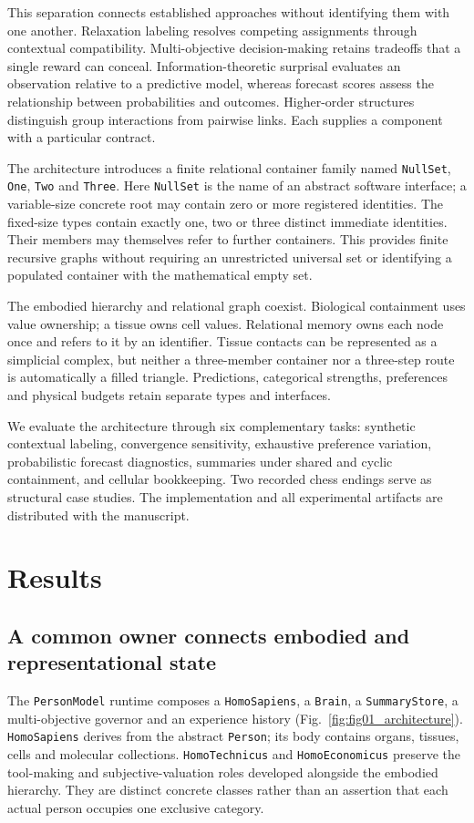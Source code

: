 \documentclass[10pt,a4paper]{article}
\begin{document}
This separation connects established approaches without identifying them with one another. Relaxation labeling resolves competing assignments through contextual compatibility\cite{hummel}. Multi-objective decision-making retains tradeoffs that a single reward can conceal\cite{roijers}. Information-theoretic surprisal evaluates an observation relative to a predictive model\cite{shannon}, whereas forecast scores assess the relationship between probabilities and outcomes\cite{brier}. Higher-order structures distinguish group interactions from pairwise links\cite{zhang}. Each supplies a component with a particular contract.

The architecture introduces a finite relational container family named \texttt{NullSet}, \texttt{One}, \texttt{Two} and \texttt{Three}. Here \texttt{NullSet} is the name of an abstract software interface; a variable-size concrete root may contain zero or more registered identities. The fixed-size types contain exactly one, two or three distinct immediate identities. Their members may themselves refer to further containers. This provides finite recursive graphs without requiring an unrestricted universal set or identifying a populated container with the mathematical empty set.

The embodied hierarchy and relational graph coexist. Biological containment uses value ownership; a tissue owns cell values. Relational memory owns each node once and refers to it by an identifier. Tissue contacts can be represented as a simplicial complex, but neither a three-member container nor a three-step route is automatically a filled triangle. Predictions, categorical strengths, preferences and physical budgets retain separate types and interfaces.

We evaluate the architecture through six complementary tasks: synthetic contextual labeling, convergence sensitivity, exhaustive preference variation, probabilistic forecast diagnostics, summaries under shared and cyclic containment, and cellular bookkeeping. Two recorded chess endings serve as structural case studies. The implementation and all experimental artifacts are distributed with the manuscript.

\section*{Results}
\subsection*{A common owner connects embodied and representational state}
The \texttt{PersonModel} runtime composes a \texttt{HomoSapiens}, a \texttt{Brain}, a \texttt{SummaryStore}, a multi-objective governor and an experience history (Fig.~\ref{fig:fig01_architecture}). \texttt{HomoSapiens} derives from the abstract \texttt{Person}; its body contains organs, tissues, cells and molecular collections. \texttt{HomoTechnicus} and \texttt{HomoEconomicus} preserve the tool-making and subjective-valuation roles developed alongside the embodied hierarchy. They are distinct concrete classes rather than an assertion that each actual person occupies one exclusive category.
\end{document}
